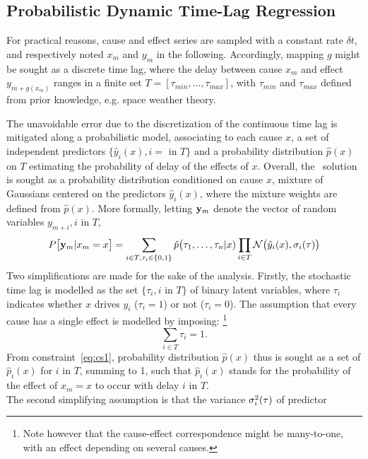 \subsection{Probabilistic Dynamic Time-Lag Regression}

For practical reasons, cause and effect series are sampled with a constant rate $\delta t$, and 
respectively noted ${x_m}$ and ${y_m}$ in the following. Accordingly, mapping $g$ might be sought 
as a discrete time lag, where the delay between cause $x_m$ and effect $y_{m+g(x_m)}$ ranges in a 
finite set $T = [\tau_{min}, \ldots, \tau_{max}]$, with  $\tau_{min}$ and  $\tau_{max}$ defined 
from prior knowledge, e.g. space weather theory. 

The unavoidable error due to the discretization of the continuous time lag is mitigated along a 
probabilistic model, associating to each cause $x$, a set of independent predictors 
$\{\hat y_i(x),i=$ in $T\}$ and a probability distribution $\hat p(x)$ on $T$ estimating the 
probability of delay of the effects of $x$. Overall, the \XX\ solution is sought as a probability 
distribution conditioned on cause $x$, mixture of Gaussians centered on the predictors 
$\hat y_i(x)$, where the mixture weights are defined from $\hat p(x)$. More formally, letting 
${\bf y}_m$ denote the vector of random variables $y_{m+i}, i$ in $T$, 
%
\begin{equation}\label{eq:py}
  P\bigl[{\bf y}_{m}\vert x_m=x\bigr] = 
  \sum_{i \in T, \tau_i\in\{0,1\}} \hat p\bigl(\tau_1,\ldots,\tau_n\vert x) 
  \prod_{i\in T} {\cal N}\bigl(\hat y_i(x),\sigma_i(\tau)\bigr)
\end{equation}
%
Two simplifications are made for the sake of the analysis. Firstly, the stochastic time lag is 
modelled as the set $\{\tau_i, i$ in $ T\}$ of binary latent variables, where $\tau_i$ indicates 
whether $x$ drives $y_i$ ($\tau_i=1$) or not ($\tau_i=0$). The assumption that every cause has a 
single effect is modelled by imposing: \footnote{Note however that the cause-effect correspondence 
might be many-to-one, with an effect depending on several causes.}
%
\begin{equation}\label{eq:cs1}
\sum_{i \in T} \tau_i = 1.
\end{equation}
%
From constraint~\cref{eq:cs1}, probability distribution $\hat p(x)$ thus is sought as a set of 
$\hat p_i(x)$ for $i$ in $T$, summing to 1, such that $\hat p_i(x)$ stands for the probability of 
the effect of $x_m=x$ to occur with delay $i$ in $T$. \\
The second simplifying assumption is that the variance $\sigma_i^2({\bf \tau})$ of predictor 
